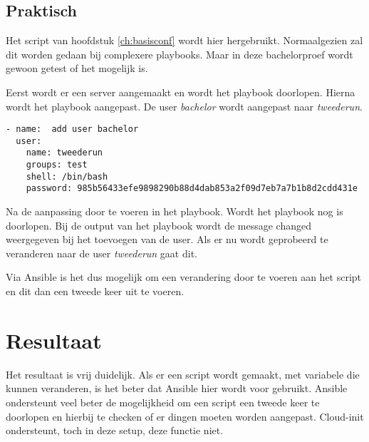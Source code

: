 \subsection{Praktisch}

Het script van hoofdstuk \ref*{ch:basisconf} wordt hier hergebruikt. Normaalgezien zal dit worden gedaan bij complexere playbooks. Maar in deze bachelorproef wordt gewoon getest of het mogelijk is.

Eerst wordt er een server aangemaakt en wordt het playbook doorlopen. Hierna wordt het playbook aangepast. De user \textit{bachelor} wordt aangepast naar \textit{tweederun}.
\begin{lstlisting}
- name:  add user bachelor
  user:
    name: tweederun
    groups: test
    shell: /bin/bash
    password: 985b56433efe9898290b88d4dab853a2f09d7eb7a7b1b8d2cdd431e
\end{lstlisting}

Na de aanpassing door te voeren in het playbook. Wordt het playbook nog is doorlopen. Bij de output van het playbook wordt de message changed weergegeven bij het toevoegen van de user. Als er nu wordt geprobeerd te veranderen naar de user \textit{tweederun} gaat dit.

Via Ansible is het dus mogelijk om een verandering door te voeren aan het script en dit dan een tweede keer uit te voeren.

\section{Resultaat}
Het resultaat is vrij duidelijk. Als er een script wordt gemaakt, met variabele die kunnen veranderen, is het beter dat Ansible hier wordt voor gebruikt. Ansible ondersteunt veel beter de mogelijkheid om een script een tweede keer te doorlopen en hierbij te checken of er dingen moeten worden aangepast. Cloud-init ondersteunt, toch in deze setup, deze functie niet.


